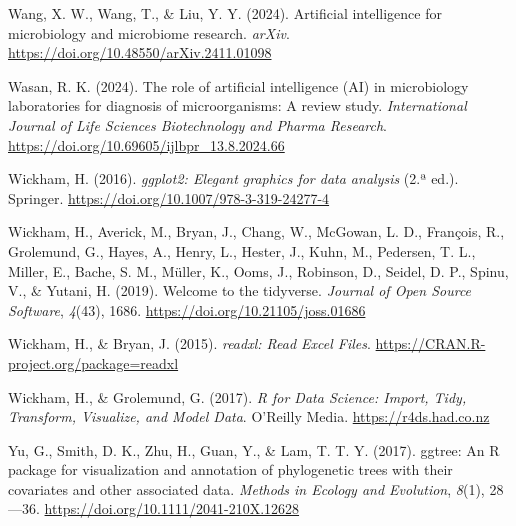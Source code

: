 \documentclass[
  spanish,
  letterpaper,
  DIV=11,
  numbers=noendperiod]{scrreprt}
\newlength{\cslhangindent}
\newenvironment{CSLReferences}[2] %
 {\begin{list}{}{%
  \setlength{\itemindent}{0pt}
  \setlength{\leftmargin}{0pt}
  \setlength{\parsep}{0pt}
  \ifodd #1
   \setlength{\leftmargin}{\cslhangindent}
   \setlength{\itemindent}{-1\cslhangindent}
  \fi
  \setlength{\itemsep}{#2\baselineskip}}}
 {\end{list}}
\begin{document}
\begin{CSLReferences}{1}{0}
Wang, X. W., Wang, T., \& Liu, Y. Y. (2024). Artificial intelligence for
microbiology and microbiome research. \emph{arXiv}.
\url{https://doi.org/10.48550/arXiv.2411.01098}

Wasan, R. K. (2024). The role of artificial intelligence (AI) in
microbiology laboratories for diagnosis of microorganisms: A review
study. \emph{International Journal of Life Sciences Biotechnology and
Pharma Research}. \url{https://doi.org/10.69605/ijlbpr_13.8.2024.66}

Wickham, H. (2016). \emph{{ggplot2: Elegant graphics for data analysis}}
(2.ª ed.). Springer. \url{https://doi.org/10.1007/978-3-319-24277-4}

Wickham, H., Averick, M., Bryan, J., Chang, W., McGowan, L. D.,
François, R., Grolemund, G., Hayes, A., Henry, L., Hester, J., Kuhn, M.,
Pedersen, T. L., Miller, E., Bache, S. M., Müller, K., Ooms, J.,
Robinson, D., Seidel, D. P., Spinu, V., \& Yutani, H. (2019). {Welcome
to the tidyverse}. \emph{Journal of Open Source Software}, \emph{4}(43),
1686. \url{https://doi.org/10.21105/joss.01686}

Wickham, H., \& Bryan, J. (2015). \emph{readxl: Read Excel Files}.
\url{https://CRAN.R-project.org/package=readxl}

Wickham, H., \& Grolemund, G. (2017). \emph{R for Data Science: Import,
Tidy, Transform, Visualize, and Model Data}. O'Reilly Media.
\url{https://r4ds.had.co.nz}

Yu, G., Smith, D. K., Zhu, H., Guan, Y., \& Lam, T. T. Y. (2017).
{ggtree: An R package for visualization and annotation of phylogenetic
trees with their covariates and other associated data}. \emph{Methods in
Ecology and Evolution}, \emph{8}(1), 28---36.
\url{https://doi.org/10.1111/2041-210X.12628}

\end{CSLReferences}
\end{document}
